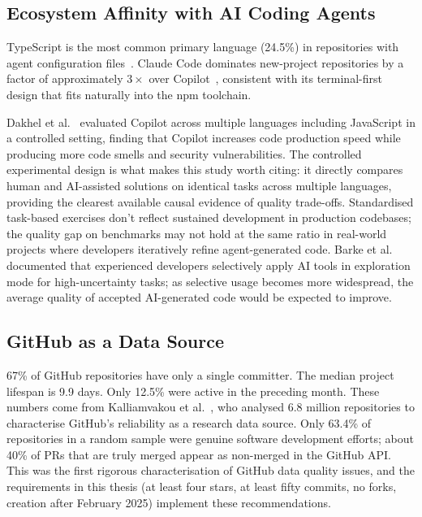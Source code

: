 \subsection{Ecosystem Affinity with AI Coding Agents}

TypeScript is the most common primary language (24.5\%) in repositories with agent configuration files~\cite{galsterConfig2026}. Claude Code dominates new-project repositories by a factor of approximately $3\times$ over Copilot~\cite{robbesAgenticVery2026}, consistent with its terminal-first design that fits naturally into the npm toolchain.

Dakhel et al.~\cite{dakhel2023} evaluated Copilot across multiple languages including JavaScript in a controlled setting, finding that Copilot increases code production speed while producing more code smells and security vulnerabilities. The controlled experimental design is what makes this study worth citing: it directly compares human and AI-assisted solutions on identical tasks across multiple languages, providing the clearest available causal evidence of quality trade-offs. Standardised task-based exercises don't reflect sustained development in production codebases; the quality gap on benchmarks may not hold at the same ratio in real-world projects where developers iteratively refine agent-generated code. Barke et al.~\cite{barke2023} documented that experienced developers selectively apply AI tools in exploration mode for high-uncertainty tasks; as selective usage becomes more widespread, the average quality of accepted AI-generated code would be expected to improve.

\subsection{GitHub as a Data Source}

67\% of GitHub repositories have only a single committer. The median project lifespan is 9.9 days. Only 12.5\% were active in the preceding month. These numbers come from Kalliamvakou et al.~\cite{kalliamvakou2016}, who analysed 6.8 million repositories to characterise GitHub's reliability as a research data source. Only 63.4\% of repositories in a random sample were genuine software development efforts; about 40\% of PRs that are truly merged appear as non-merged in the GitHub API. This was the first rigorous characterisation of GitHub data quality issues, and the requirements in this thesis (at least four stars, at least fifty commits, no forks, creation after February 2025) implement these recommendations.

